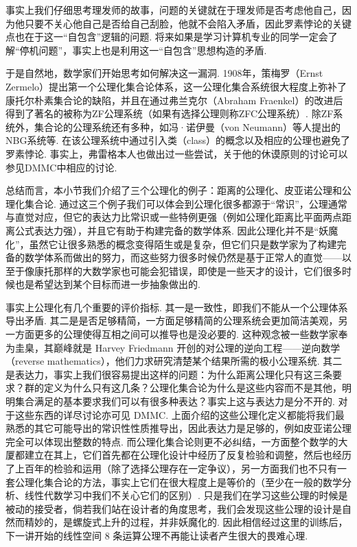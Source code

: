 事实上我们仔细思考理发师的故事，问题的关键就在于理发师是否考虑他自己，因为他只要不关心他自己是否给自己刮脸，他就不会陷入矛盾，因此罗素悖论的关键点也在于这一``自包含''逻辑的问题. 将来如果是学习计算机专业的同学一定会了解``停机问题''，事实上也是利用这一``自包含''思想构造的矛盾.

于是自然地，数学家们开始思考如何解决这一漏洞. 1908年，策梅罗（Ernst Zermelo）提出第一个公理化集合论体系，这一公理化集合系统很大程度上弥补了康托尔朴素集合论的缺陷，并且在通过弗兰克尔（Abraham Fraenkel）的改进后得到了著名的被称为ZF公理系统（如果有选择公理则称ZFC公理系统）. 除ZF系统外，集合论的公理系统还有多种，如冯·诺伊曼（von Neumann）等人提出的NBG系统等. 在该公理系统中通过引入类（class）的概念以及相应的公理也避免了罗素悖论. 事实上，弗雷格本人也做出过一些尝试，关于他的休谟原则的讨论可以参见DMMC中相应的讨论.

总结而言，本小节我们介绍了三个公理化的例子：距离的公理化、皮亚诺公理和公理化集合论. 通过这三个例子我们可以体会到公理化很多都源于``常识''，公理通常与直觉对应，但它的表达力比常识或一些特例更强（例如公理化距离比平面两点距离公式表达力强），并且它有助于构建完备的数学体系. 因此公理化并不是``妖魔化''，虽然它让很多熟悉的概念变得陌生或是复杂，但它们只是数学家为了构建完备的数学体系而做出的努力，而这些努力很多时候仍然是基于正常人的直觉——以至于像康托那样的大数学家也可能会犯错误，即使是一些天才的设计，它们很多时候也是希望达到某个目标而进一步抽象做出的.

事实上公理化有几个重要的评价指标. 其一是一致性，即我们不能从一个公理体系导出矛盾. 其二是是否足够精简，一方面足够精简的公理系统会更加简洁美观，另一方面更多的公理使得互相之间可以推导也是没必要的. 这种观念被一些数学家奉为圭臬，其巅峰就是 Harvey Friedmann 开创的对公理的逆向工程——逆向数学（reverse mathematics），他们力求研究清楚某个结果所需的极小公理系统. 其二是表达力，事实上我们很容易提出这样的问题：为什么距离公理化只有这三条要求？群的定义为什么只有这几条？公理化集合论为什么是这些内容而不是其他，明明集合满足的基本要求我们可以有很多种表达？事实上这与表达力是分不开的. 对于这些东西的详尽讨论亦可见 DMMC. 上面介绍的这些公理化定义都能将我们最熟悉的其它可能导出的常识性性质推导出，因此表达力是足够的，例如皮亚诺公理完全可以体现出整数的特点. 而公理化集合论则更不必纠结，一方面整个数学的大厦都建立在其上，它们首先都在公理化设计中经历了反复检验和调整，然后也经历了上百年的检验和运用（除了选择公理存在一定争议），另一方面我们也不只有一套公理化集合论的方法，事实上它们在很大程度上是等价的（至少在一般的数学分析、线性代数学习中我们不关心它们的区别）. 只是我们在学习这些公理的时候是被动的接受者，倘若我们站在设计者的角度思考，我们会发现这些公理的设计是自然而精妙的，是螺旋式上升的过程，并非妖魔化的. 因此相信经过这里的训练后，下一讲开始的线性空间 8 条运算公理不再能让读者产生很大的畏难心理.

